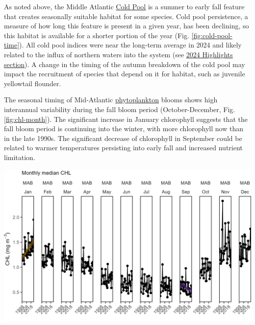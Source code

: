 \documentclass[
  10pt,
]{article}
\let\origfigure\figure
\let\endorigfigure\endfigure
\renewenvironment{figure}[1][2] {
    \expandafter\origfigure\expandafter[H]
} {
    \endorigfigure
}
\begin{document}
As noted above, the Middle Atlantic \href{https://noaa-edab.github.io/catalog/cold_pool.html}{Cold Pool} is a summer to early fall feature that creates seasonally suitable habitat for some species. Cold pool persistence, a measure of how long this feature is present in a given year, has been declining, so this habitat is available for a shorter portion of the year (Fig. \ref{fig:cold-pool-time}). All cold pool indices were near the long-term average in 2024 and likely related to the influx of northern waters into the system (see \hyperref[highlights]{2024 Highlights section}). A change in the timing of the autumn breakdown of the cold pool may impact the recruitment of species that depend on it for habitat, such as juvenile yellowtail flounder.

The seasonal timing of Mid-Atlantic \href{https://noaa-edab.github.io/catalog/chl_pp.html}{phytoplankton} blooms shows high interannual variability during the fall bloom period (October-December, Fig. \ref{fig:chl-month}). The significant increase in January chlorophyll suggests that the fall bloom period is continuing into the winter, with more chlorophyll now than in the late 1990s. The significant decrease of chlorophyll in September could be related to warmer temperatures persisting into early fall and increased nutrient limitation.

\begin{figure}

{\centering \includegraphics[width=6.5in]{images/MidAtlantic/monthly_chl_MidAtlantic_2025-09-05} 

}

\caption{Monthly median chlorophyll a concentration in the MAB (black) with significant increase in January (orange line) and decrease in September (purple line).}\label{fig:chl-month}
\end{figure}
\end{document}
